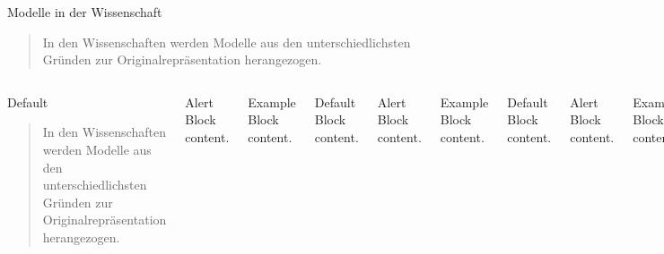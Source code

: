 \begin{frame}{Modelle in der Wissenschaft}
    \begin{quote}
        In den Wissenschaften werden Modelle aus den unterschiedlichsten Gründen zur Originalrepräsentation herangezogen.~\parencite[138]{stachowiak}
    \end{quote}
  \begin{columns}[T,onlytextwidth]
      \begin{block}{Default}
            \begin{quote}
        In den Wissenschaften werden Modelle aus den unterschiedlichsten Gründen zur Originalrepräsentation herangezogen.~\parencite[138]{stachowiak}
    \end{quote}
      \end{block}

      \begin{alertblock}{Alert}
        Block content.
      \end{alertblock}

      \begin{exampleblock}{Example}
        Block content.
      \end{exampleblock}


      \begin{block}{Default}
        Block content.
      \end{block}

      \begin{alertblock}{Alert}
        Block content.
      \end{alertblock}

      \begin{exampleblock}{Example}
        Block content.
      \end{exampleblock}
      


      \begin{block}{Default}
        Block content.
      \end{block}

      \begin{alertblock}{Alert}
        Block content.
      \end{alertblock}

      \begin{exampleblock}{Example}
        Block content.
      \end{exampleblock}
  \end{columns}
\end{frame}


